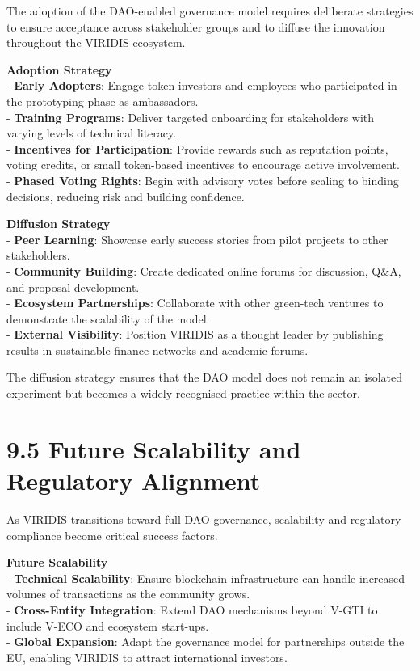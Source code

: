\documentclass[
  english,
  12pt,
  oneside,
  open=any]{scrbook}
\begin{document}
The adoption of the DAO-enabled governance model requires deliberate
strategies to ensure acceptance across stakeholder groups and to diffuse
the innovation throughout the VIRIDIS ecosystem.

\textbf{Adoption Strategy}\\
- \textbf{Early Adopters}: Engage token investors and employees who
participated in the prototyping phase as ambassadors.\\
- \textbf{Training Programs}: Deliver targeted onboarding for
stakeholders with varying levels of technical literacy.\\
- \textbf{Incentives for Participation}: Provide rewards such as
reputation points, voting credits, or small token-based incentives to
encourage active involvement.\\
- \textbf{Phased Voting Rights}: Begin with advisory votes before
scaling to binding decisions, reducing risk and building confidence.

\textbf{Diffusion Strategy}\\
- \textbf{Peer Learning}: Showcase early success stories from pilot
projects to other stakeholders.\\
- \textbf{Community Building}: Create dedicated online forums for
discussion, Q\&A, and proposal development.\\
- \textbf{Ecosystem Partnerships}: Collaborate with other green-tech
ventures to demonstrate the scalability of the model.\\
- \textbf{External Visibility}: Position VIRIDIS as a thought leader by
publishing results in sustainable finance networks and academic forums.

The diffusion strategy ensures that the DAO model does not remain an
isolated experiment but becomes a widely recognised practice within the
sector.

\section{9.5 Future Scalability and Regulatory
Alignment}\label{sec-scalability}

As VIRIDIS transitions toward full DAO governance, scalability and
regulatory compliance become critical success factors.

\textbf{Future Scalability}\\
- \textbf{Technical Scalability}: Ensure blockchain infrastructure can
handle increased volumes of transactions as the community grows.\\
- \textbf{Cross-Entity Integration}: Extend DAO mechanisms beyond V-GTI
to include V-ECO and ecosystem start-ups.\\
- \textbf{Global Expansion}: Adapt the governance model for partnerships
outside the EU, enabling VIRIDIS to attract international investors.
\end{document}
